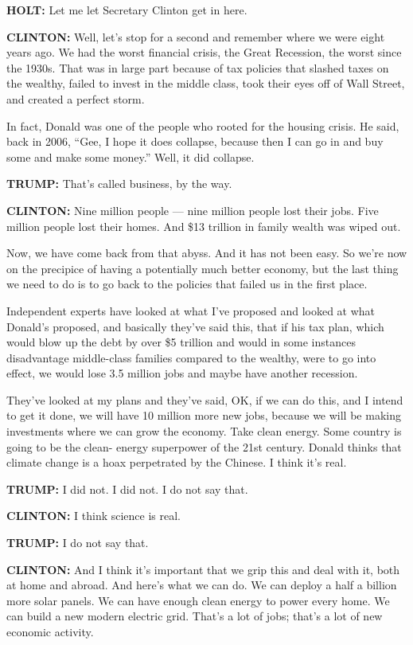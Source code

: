 \textbf{HOLT:} Let me let Secretary Clinton get in here.

\textbf{CLINTON:} Well, let's stop for a second and remember where we
were eight years ago. We had the worst financial crisis, the Great
Recession, the worst since the 1930s. That was in large part because of
tax policies that slashed taxes on the wealthy, failed to invest in the
middle class, took their eyes off of Wall Street, and created a perfect
storm.

In fact, Donald was one of the people who rooted for the housing crisis.
He said, back in 2006, ``Gee, I hope it does collapse, because then I
can go in and buy some and make some money.'' Well, it did collapse.

\textbf{TRUMP:} That's called business, by the way.

\textbf{CLINTON:} Nine million people --- nine million people lost their
jobs. Five million people lost their homes. And \$13 trillion in family
wealth was wiped out.

Now, we have come back from that abyss. And it has not been easy. So
we're now on the precipice of having a potentially much better economy,
but the last thing we need to do is to go back to the policies that
failed us in the first place.

Independent experts have looked at what I've proposed and looked at what
Donald's proposed, and basically they've said this, that if his tax
plan, which would blow up the debt by over \$5 trillion and would in
some instances disadvantage middle-class families compared to the
wealthy, were to go into effect, we would lose 3.5 million jobs and
maybe have another recession.

They've looked at my plans and they've said, OK, if we can do this, and
I intend to get it done, we will have 10 million more new jobs, because
we will be making investments where we can grow the economy. Take clean
energy. Some country is going to be the clean- energy superpower of the
21st century. Donald thinks that climate change is a hoax perpetrated by
the Chinese. I think it's real.

\textbf{TRUMP:} I did not. I did not. I do not say that.

\textbf{CLINTON:} I think science is real.

\textbf{TRUMP:} I do not say that.

\textbf{CLINTON:} And I think it's important that we grip this and deal
with it, both at home and abroad. And here's what we can do. We can
deploy a half a billion more solar panels. We can have enough clean
energy to power every home. We can build a new modern electric grid.
That's a lot of jobs; that's a lot of new economic activity.

